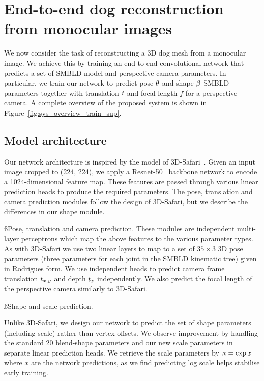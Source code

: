 \section{End-to-end dog reconstruction from monocular images} 

We now consider the task of reconstructing a 3D dog mesh from a monocular image. We achieve this by training an end-to-end convolutional network that predicts a set of SMBLD model and perspective camera parameters. In particular, we train our network to predict pose $\theta$ and shape $\beta$ SMBLD parameters together with translation $t$ and focal length $f$ for a perspective camera. A complete overview of the proposed system is shown in Figure~\ref{fig:sys_overview_train_sup}.

\subsection{Model architecture}

Our network architecture is inspired by the model of 3D-Safari~\cite{Zuffi19Safari}. Given an input image cropped to (224, 224), we apply a Resnet-50~\cite{he2016deep} backbone network to encode a 1024-dimensional feature map. These features are passed through various linear prediction heads to produce the required parameters. The pose, translation and camera prediction modules follow the design of 3D-Safari, but we describe the differences in our shape module.

\ss{Pose, translation and camera prediction.}
These modules are independent multi-layer perceptrons which map the above features to the various parameter types. As with 3D-Safari we use two linear layers to map to a set of $35 \times 3$ 3D pose parameters (three parameters for each joint in the SMBLD kinematic tree) given in Rodrigues form. We use independent heads to predict camera frame translation $t_{x,y}$ and depth $t_{z}$ independently. We also predict the focal length of the perspective camera similarly to 3D-Safari.

\ss{Shape and scale prediction.}

Unlike 3D-Safari, we design our network to predict the set of shape parameters (including scale) rather than vertex offsets. We observe improvement by handling the standard 20 blend-shape parameters and our new scale parameters in separate linear prediction heads. We retrieve the scale parameters by $\kappa = \exp{x}$ where $x$ are the network predictions, as we find predicting log scale helps stabilise early training.

